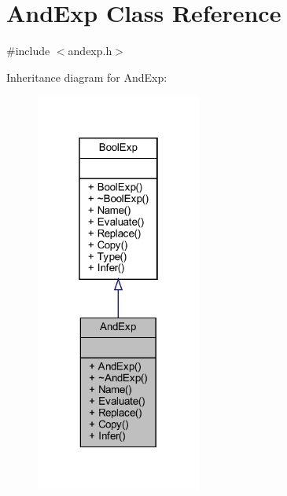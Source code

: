 \hypertarget{classAndExp}{}\section{And\+Exp Class Reference}
\label{classAndExp}


{\ttfamily \#include $<$andexp.\+h$>$}



Inheritance diagram for And\+Exp\+:
\nopagebreak
\begin{figure}[H]
\begin{center}
\leavevmode
\includegraphics[width=154pt]{classAndExp__inherit__graph}
\end{center}
\end{figure}


